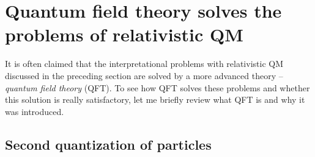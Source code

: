 \documentclass[12pt]{article}
\begin{document}
\section{Quantum field theory solves the problems of relativistic QM}
\label{QFT}

It is often claimed that the interpretational problems 
with relativistic QM discussed in the preceding section 
are solved by a more advanced theory -- {\em quantum field theory} (QFT).
To see how QFT solves these problems and whether this solution 
is really satisfactory, let me briefly review 
what QFT is and why it was introduced.

\subsection{Second quantization of particles}
\end{document}
